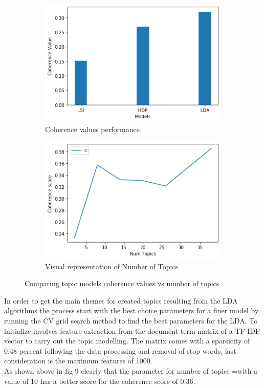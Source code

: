 \begin{figure}
      \centering
	    \begin{subfigure}{0.1\linewidth}
		\includegraphics[width=\linewidth]{postgrad_template 2/chapters/chapter1/Evaluate coherence values.png}
		\caption{Coherence values performance }
		\label{fig: Coherence Values}
	   \end{subfigure}
	   \begin{subfigure}{0.1\linewidth}
		\includegraphics[width=\linewidth]{postgrad_template 2/chapters/chapter1/Number of Topics for the overall data.png} 
		\caption{Visual representation of Number of Topics}
		\label{fig:Number of Topics selection}
	    \end{subfigure}
	   \vfill
	 \caption{Comparing topic models coherence values vs  number of topics}
\end{figure}

In order to get the main themes for created topics resulting from the LDA algorithms the process start with the best choice parameters for a finer model by running the CV grid search method to find the best parameters for the LDA.  To initialize  involves feature extraction from the document term matrix of a TF-IDF vector to carry out the topic modelling. The matrix comes with a sparsicity of 0,48 percent following the data processing and removal of stop words, last consideration is the maximum features of 1000.\\
As shown above in fig 9 clearly that the parameter for number of topics =with a value of 10 has a better score for the coherence score of 0.36.\\


